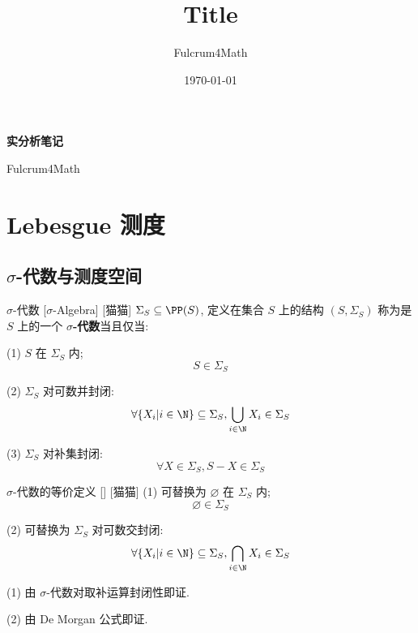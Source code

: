 \documentclass[UTF8]{ctexart}
\title{Title}
\author{Fulcrum4Math}
\date{\today}
\begin{document}
    \begin{center}
        {\LARGE\textbf{实分析笔记}}

        Fulcrum4Math
    \end{center}

    \tableofcontents

    \newpage

    \section{Lebesgue 测度} %

        \subsection{\(\sigma\)-代数与测度空间} %

            \begin{dfn}
                {\(\sigma\)-代数}
                [\(\sigma\)-Algebra]
                [猫猫]
                \(\Sigma_S\subseteq\PP(S)\), 定义在集合 \(S\) 上的结构 \((S,\Sigma_S)\) 称为是 \(S\) 上的一个 \textbf{\(\sigma\)-代数}当且仅当: 

                (1) \(S\) 在 \(\Sigma_S\) 内; 
                \[S\in\Sigma_S\]

                (2) \(\Sigma_S\) 对可数并封闭: 
                \[\forall\{X_i|i\in\N\}\subseteq\Sigma_S, \bigcup_{i\in\N}X_i\in\Sigma_S\]

                (3) \(\Sigma_S\) 对补集封闭: 
                \[\forall X\in\Sigma_S, S-X\in\Sigma_S\]
            \end{dfn}

            \begin{ppt}
                {\(\sigma\)-代数的等价定义}
                []
                [猫猫]
                (1) 可替换为 \(\varnothing\) 在 \(\Sigma_S\) 内; 
                \[\varnothing\in\Sigma_S\]

                (2) 可替换为 \(\Sigma_S\) 对可数交封闭: 
                \[\forall\{X_i|i\in\N\}\subseteq\Sigma_S, \bigcap_{i\in\N}X_i\in\Sigma_S\]
            \end{ppt}
            
            \begin{prf}
                (1) 由 \(\sigma\)-代数对取补运算封闭性即证. 

                (2) 由 De Morgan 公式即证. 
            \end{prf}
\end{document}
